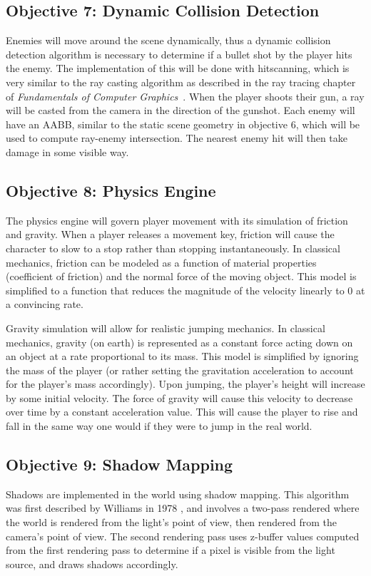 \documentclass {article}
\begin{document}
\subsection{Objective 7: Dynamic Collision Detection}
Enemies will move around the scene dynamically, thus a dynamic collision detection algorithm is necessary to determine if a bullet shot by the player hits the enemy. The implementation of this will be done with hitscanning, which is very similar to the ray casting algorithm as described in the ray tracing chapter of \textit{Fundamentals of Computer Graphics}~\cite{rtbook}. When the player shoots their gun, a ray will be casted from the camera in the direction of the gunshot. Each enemy will have an AABB, similar to the static scene geometry in objective 6, which will be used to compute ray-enemy intersection. The nearest enemy hit will then take damage in some visible way.


\subsection{Objective 8: Physics Engine}
The physics engine will govern player movement with its simulation of friction and gravity. When a player releases a movement key, friction will cause the character to slow to a stop rather than stopping instantaneously. In classical mechanics, friction can be modeled as a function of material properties (coefficient of friction) and the normal force of the moving object. This model is simplified to a function that reduces the magnitude of the velocity linearly to 0 at a convincing rate.

Gravity simulation will allow for realistic jumping mechanics. In classical mechanics, gravity (on earth) is represented as a constant force acting down on an object at a rate proportional to its mass. This model is simplified by ignoring the mass of the player (or rather setting the gravitation acceleration to account for the player's mass accordingly). Upon jumping, the player's height will increase by some initial velocity. The force of gravity will cause this velocity to decrease over time by a constant acceleration value. This will cause the player to rise and fall in the same way one would if they were to jump in the real world.

\subsection{Objective 9: Shadow Mapping}
Shadows are implemented in the world using shadow mapping. This algorithm was first described by Williams in 1978 \cite{shadowmapping}, and involves a two-pass rendered where the world is rendered from the light's point of view, then rendered from the camera's point of view. The second rendering pass uses z-buffer values computed from the first rendering pass to determine if a pixel is visible from the light source, and draws shadows accordingly.
\end{document}
